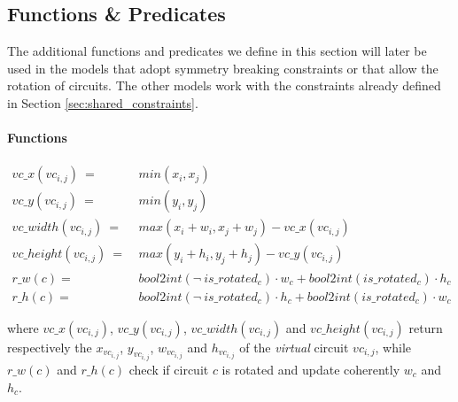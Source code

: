 
\subsection{Functions \& Predicates} \label{sec:CP_functions_predicates}
The additional functions and predicates we define in this section will later be used in the models
that adopt symmetry breaking constraints or that allow the rotation of circuits. The other models
work with the constraints already defined in Section \ref{sec:shared_constraints}.

\paragraph{Functions}
\begin{align}
  vc\_x(vc_{i,j})\        =\  & min(x_i, x_j)                                                     \nonumber \\
  vc\_y(vc_{i,j})\        =\  & min(y_i, y_j)                                                     \nonumber \\
  vc\_width(vc_{i,j})\    =\  & max(x_i + w_i, x_j + w_j) - vc\_x(vc_{i,j})                       \nonumber \\
  vc\_height(vc_{i,j})\   =\  & max(y_i + h_i, y_j + h_j) - vc\_y(vc_{i,j})                       \nonumber \\
  r\_w(c) =\                  & bool2int(\neg\ is\_rotated_c) \cdot w_c + bool2int(is\_rotated_c) \cdot h_c
  \label{eq:CP_r_w}                                                                                         \\
  r\_h(c) =\                  & bool2int(\neg\ is\_rotated_c) \cdot h_c + bool2int(is\_rotated_c) \cdot w_c
  \label{eq:CP_r_h}
\end{align}

where $vc\_x(vc_{i,j})$, $vc\_y(vc_{i,j})$, $vc\_width(vc_{i,j})$ and $vc\_height(vc_{i,j})$
return respectively the $x_{vc_{i,j}}$, $y_{vc_{i,j}}$, $w_{vc_{i,j}}$ and $h_{vc_{i,j}}$ of
the \textit{virtual} circuit $vc_{i,j}$, while $r\_w(c)$ and $r\_h(c)$ check if circuit $c$
is rotated and update coherently $w_c$ and $h_c$.

